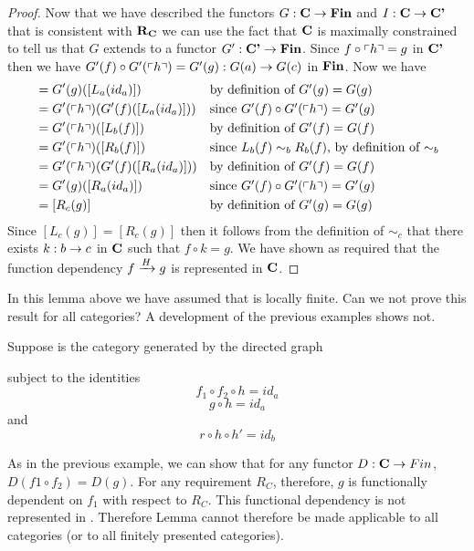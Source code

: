 \begin{proof}
Now that we have described the functors  $G: \catc \morph \Fin$ and $I:\catc \morph \catcp$ that is consistent with $\reqtc$
we can use the fact that $\catc$ is maximally constrained to tell us that $G$ extends to a functor 
$G' : \catcp \morph \Fin$. Since $f \circ \qq{h} = g$ in $\catcp$ then we have
 $G'(f) \circ G'(\qq{h}) = G'(g): G(a) \morph G(c)$ in $\Fin$.
Now we have
\begin{align*}
[L_c(g)]&= G'(g)([L_a(id_a)])              & & \mbox{by definition of $G'(g)=G(g)$}           \\
        &= G'(\qq{h}) (G'(f)([L_a(id_a)])) & & \mbox{since $G'(f) \circ G'(\qq{h}) = G'(g)$}  \\
	&= G'(\qq{h}) ([L_b(f)])       & & \mbox{by definition of $G'(f)=G(f)$}           \\
	&= G'(\qq{h}) ([R_b(f)])       & & \mbox{since $L_b(f) \sim_b R_b(f)$, by definition of $\sim_b$} \\
	&= G'(\qq{h}) (G'(f)([R_a(id_a)])) & & \mbox{by definition of $G'(f)=G(f)$}           \\
	&= G'(g)([R_a(id_a)])              & & \mbox{since $G'(f) \circ G'(\qq{h}) = G'(g)$}  \\
				&= [R_c(g)]                        & & \mbox{by definition of $G'(g)=G(g)$}           \\
\end{align*} 
Since $[L_c(g)]=[R_c(g)]$ then it follows from the definition of $\sim_c$ that there exists $k:b \morph c$ in 
$\catc$ such that $f \circ k = g$.    We have shown as required that the function dependency
$\fundep{H}{f}{g}$ is represented in $\catc$.

\end{proof}

In this lemma above we have assumed that \catcw is locally finite. Can we not prove this result for all categories? A development of the previous examples shows not.
\begin{example}
Suppose \catcw is the category generated by the directed graph

subject to the identities
\begin{equation}
\label{fdcounterfhidentity}
f_1 \circ f_2 \circ h = id_a
\end{equation}
\begin{equation}
\label{fdcounterghidentity}
g \circ h = id_a
\end{equation}
and 
\begin{equation}
\label{fdcounterrhhpidentity}
r \circ h \circ h' = id_b
\end{equation}

As in the previous example, we can show that for any functor $D:\catc \morph Fin$, $D(f1 \circ f_2)=D(g)$. For any requirement 
$R_C$, therefore,  $g$ is functionally dependent on $f_1$ 
with respect to $R_C$. This functional dependency  
is not represented in \catc. Therefore Lemma  cannot therefore be made applicable to all categories (or to all finitely presented categories).

\end{example}


